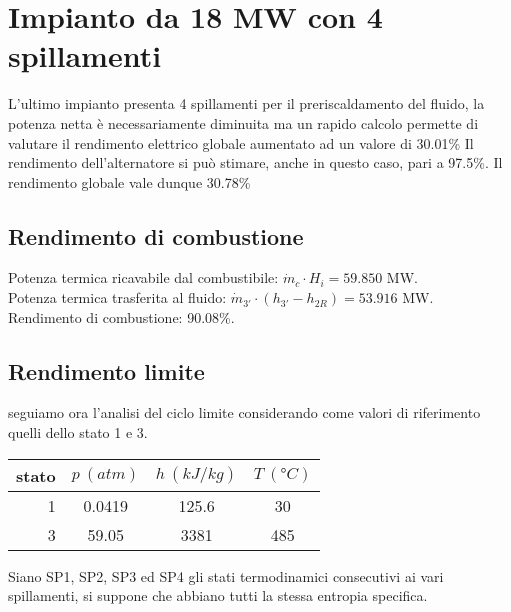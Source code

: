 \section{Impianto da 18 MW con 4 spillamenti}
L'ultimo impianto presenta 4 spillamenti per il preriscaldamento del fluido, la potenza netta è necessariamente diminuita
ma un rapido calcolo permette di valutare il rendimento elettrico globale aumentato ad un valore di 30.01\%
Il rendimento dell'alternatore si può stimare, anche in questo caso, pari a 97.5\%.
Il rendimento globale vale dunque 30.78\%

\subsection{Rendimento di combustione}
Potenza termica ricavabile dal combustibile: $\dot m_c \cdot H_i = 59.850$ MW.\\
Potenza termica trasferita al fluido: $\dot m_{3'} \cdot (h_{3'} - h_{2R}) = 53.916$ MW.\\
Rendimento di combustione: 90.08\%.

\subsection{Rendimento limite}
seguiamo ora l'analisi del ciclo limite considerando come valori di riferimento quelli dello stato 1 e 3.
\begin{center}
    \begin{tabular}{r|c|c|c}
        stato    & $p\ (atm)$ & $h\ (kJ/kg)$ & $T\ (\text{°}C) $\\ \hline
        1   &        0.0419 &          125.6   &           30     \\ \hline
        3   &        59.05  &           3381   &           485
    \end{tabular}
\end{center}
Siano SP1, SP2, SP3 ed SP4 gli stati termodinamici consecutivi ai vari spillamenti, si suppone che abbiano tutti la stessa entropia specifica.


